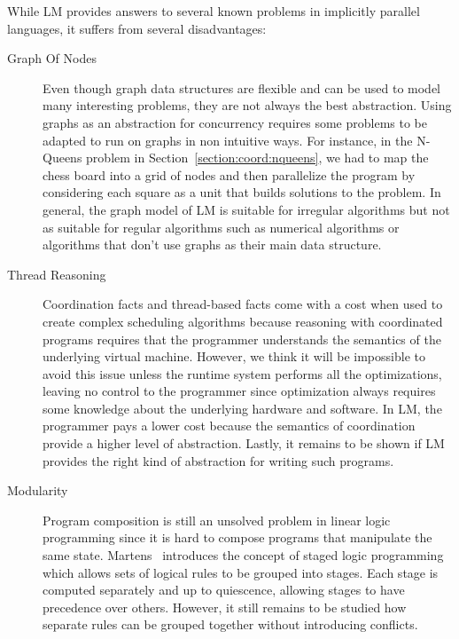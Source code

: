 While LM provides answers to several known problems in implicitly parallel
languages, it suffers from several disadvantages:

\begin{description}

   \item[Graph Of Nodes] Even though graph data structures are flexible and can
      be used to model many interesting problems, they are not always the best
      abstraction. Using graphs as an abstraction for concurrency requires
      some problems to be adapted to run on graphs in non intuitive
      ways. For instance, in the N-Queens problem in
      Section~\ref{section:coord:nqueens}, we had to map the chess board
      into a grid of nodes and then parallelize the program by considering each
      square as a unit that builds solutions to the problem. In general, the
      graph model of LM is suitable for irregular algorithms but not as suitable
      for regular algorithms such as numerical algorithms or algorithms that
      don't use graphs as their main data structure.

   \item[Thread Reasoning] Coordination facts and thread-based facts come with a
      cost when used to create complex scheduling algorithms because reasoning
      with coordinated programs requires that the programmer understands the
      semantics of the underlying virtual machine. However, we think it will be
      impossible to avoid this issue unless the runtime system performs all the
      optimizations, leaving no control to the programmer since optimization
      always requires some knowledge about the underlying hardware and software.
      In LM, the programmer pays a lower cost because the semantics of
      coordination provide a higher level of abstraction. Lastly, it remains to
      be shown if LM provides the right kind of abstraction for writing such
      programs.

   \item[Modularity] Program composition is still an unsolved problem in linear
      logic programming since it is hard to compose programs that manipulate the
      same state. Martens~\cite{chris-thesis} introduces the concept of staged
      logic programming which allows sets of logical rules to be grouped into
      stages. Each stage is computed separately and up to quiescence, allowing
      stages to have precedence over others. However, it still remains to be
      studied how separate rules can be grouped together without introducing
      conflicts.

\end{description}

